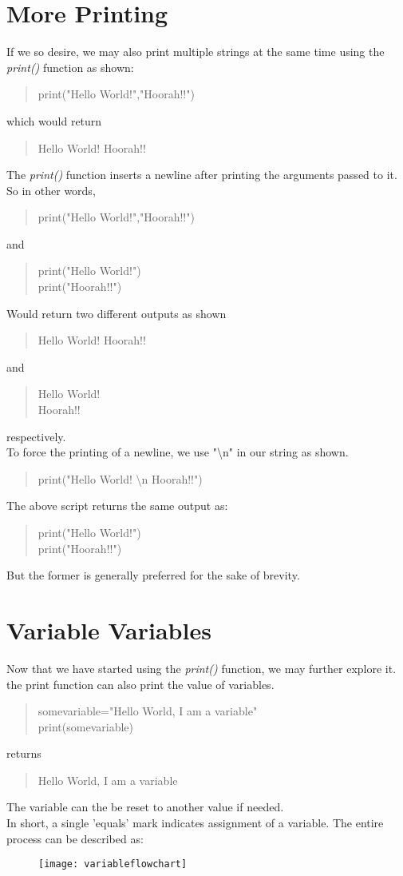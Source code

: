 \section{More Printing}
If we so desire, we may also print multiple strings at the same time using the \emph{print()} function as shown:
\begin{quote}
print("Hello World!","Hoorah!!")
\end{quote}
which would return
\begin{quote}
Hello World! Hoorah!!
\end{quote}
The \emph{print()} function inserts a newline after printing the arguments passed to it. So in other words,
\begin{quote}
print("Hello World!","Hoorah!!")
\end{quote}
and 
\begin{quote}
print("Hello World!")\\
print("Hoorah!!")
\end{quote}
Would return two different outputs as shown
\begin{quote}
Hello World! Hoorah!!
\end{quote}
and 
\begin{quote}
Hello World!\\
Hoorah!!
\end{quote}
respectively.\\
To force the printing of a newline, we use "\textbackslash n" in our string as shown.
\begin{quote}
print("Hello World! \textbackslash n Hoorah!!")
\end{quote}
The above script returns the same output as:
\begin{quote}
print("Hello World!")\\
print("Hoorah!!")
\end{quote}
But the former is generally preferred for the sake of brevity.
\section{Variable Variables}
Now that we have started using the \emph{print()} function, we may further explore it.\\
the print function can also print the value of variables.
\begin{quote}
somevariable="Hello World, I am a variable"\\
print(somevariable)
\end{quote}
returns
\begin{quote}
Hello World, I am a variable
\end{quote}
The variable can the be reset to another value if needed.\\ In short, a single 'equals' mark indicates assignment of a variable.
The entire process can be described as: 
\begin{figure}[h]
\texttt{[image: variableflowchart]}
\end{figure}
